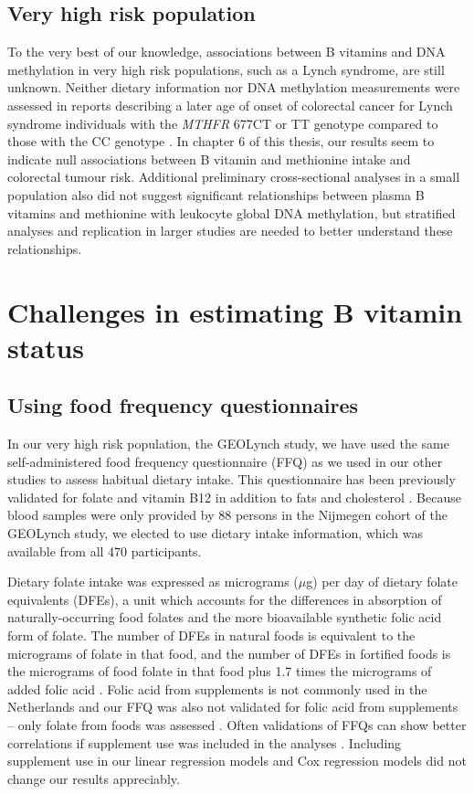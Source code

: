 \subsection{Very high risk population} %
\noindent To the very best of our knowledge, associations between B vitamins and DNA methylation in very high risk populations, such as a Lynch syndrome, are still unknown. Neither dietary information nor DNA methylation measurements were assessed in reports describing a later age of onset of colorectal cancer for Lynch syndrome individuals with the \emph{MTHFR} 677CT or TT genotype compared to those with the CC genotype \cite{c715,c716}. In chapter 6 of this thesis, our results seem to indicate null associations between B vitamin and methionine intake and colorectal tumour risk. Additional preliminary cross-sectional analyses in a small population also did not suggest significant relationships between plasma B vitamins and methionine with leukocyte global DNA methylation, but stratified analyses and replication in larger studies are needed to better understand these relationships.

\section{Challenges in estimating B vitamin status} %
\subsection{Using food frequency questionnaires} %
\noindent In our very high risk population, the GEOLynch study, we have used the same self-administered food frequency questionnaire (FFQ) as we used in our other studies to assess habitual dietary intake. This questionnaire has been previously validated for folate and vitamin B12 \cite{c717} in addition to fats and cholesterol \cite{c718}. Because blood samples were only provided by 88 persons in the Nijmegen cohort of the GEOLynch study, we elected to use dietary intake information, which was available from all 470 participants.

\noindent Dietary folate intake was expressed as micrograms ($\mu$g) per day of dietary folate equivalents (DFEs), a unit which accounts for the differences in absorption of naturally-occurring food folates and the more bioavailable synthetic folic acid form of folate. The number of DFEs in natural foods is equivalent to the micrograms of folate in that food, and the number of DFEs in fortified foods is the micrograms of food folate in that food plus 1.7 times the micrograms of added folic acid \cite{c719}. Folic acid from supplements is not commonly used in the Netherlands \cite{c720} and our FFQ was also not validated for folic acid from supplements -- only folate from foods was assessed \cite{c717}. Often validations of FFQs can show better correlations if supplement use was included in the analyses \cite{c721,c722,c723}. Including supplement use in our linear regression models and Cox regression models did not change our results appreciably.


